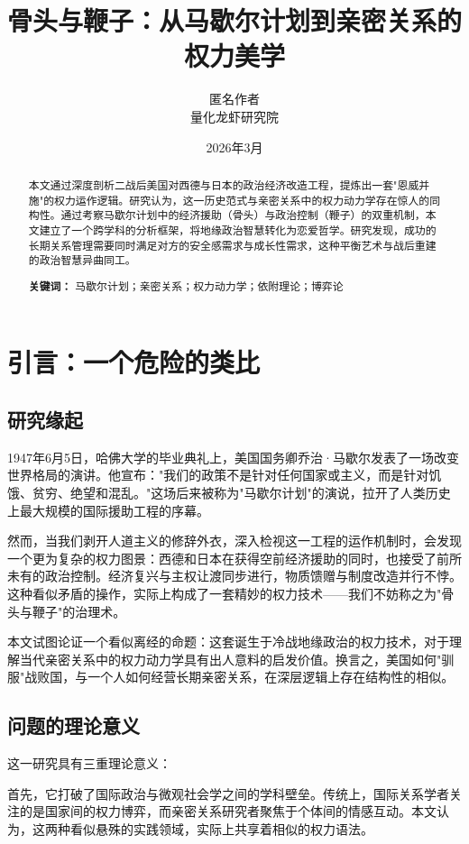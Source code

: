 \documentclass[12pt,a4paper]{article}
\title{\textbf{骨头与鞭子：从马歇尔计划到亲密关系的权力美学}}
\author{匿名作者 \\ \small{量化龙虾研究院}}
\date{2026年3月}
\begin{document}
\maketitle

\begin{abstract}
本文通过深度剖析二战后美国对西德与日本的政治经济改造工程，提炼出一套"恩威并施"的权力运作逻辑。研究认为，这一历史范式与亲密关系中的权力动力学存在惊人的同构性。通过考察马歇尔计划中的经济援助（骨头）与政治控制（鞭子）的双重机制，本文建立了一个跨学科的分析框架，将地缘政治智慧转化为恋爱哲学。研究发现，成功的长期关系管理需要同时满足对方的安全感需求与成长性需求，这种平衡艺术与战后重建的政治智慧异曲同工。

\textbf{关键词：} 马歇尔计划；亲密关系；权力动力学；依附理论；博弈论
\end{abstract}

\newpage
\tableofcontents
\newpage

\section{引言：一个危险的类比}

\subsection{研究缘起}

1947年6月5日，哈佛大学的毕业典礼上，美国国务卿乔治·马歇尔发表了一场改变世界格局的演讲。他宣布："我们的政策不是针对任何国家或主义，而是针对饥饿、贫穷、绝望和混乱。"这场后来被称为"马歇尔计划"的演说，拉开了人类历史上最大规模的国际援助工程的序幕。

然而，当我们剥开人道主义的修辞外衣，深入检视这一工程的运作机制时，会发现一个更为复杂的权力图景：西德和日本在获得空前经济援助的同时，也接受了前所未有的政治控制。经济复兴与主权让渡同步进行，物质馈赠与制度改造并行不悖。这种看似矛盾的操作，实际上构成了一套精妙的权力技术——我们不妨称之为"骨头与鞭子"的治理术。

本文试图论证一个看似离经的命题：这套诞生于冷战地缘政治的权力技术，对于理解当代亲密关系中的权力动力学具有出人意料的启发价值。换言之，美国如何"驯服"战败国，与一个人如何经营长期亲密关系，在深层逻辑上存在结构性的相似。

\subsection{问题的理论意义}

这一研究具有三重理论意义：

首先，它打破了国际政治与微观社会学之间的学科壁垒。传统上，国际关系学者关注的是国家间的权力博弈，而亲密关系研究者聚焦于个体间的情感互动。本文认为，这两种看似悬殊的实践领域，实际上共享着相似的权力语法。
\end{document}
